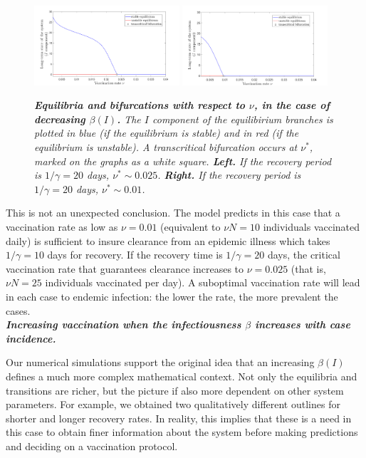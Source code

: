 \documentclass[10pt]{article}
\begin{document}
\begin{figure}[h!]
\begin{center}
\includegraphics[width=0.48\textwidth]{figures/decreasing_beta_gamma_20.png}
\includegraphics[width=0.48\textwidth]{figures/decreasing_beta_gamma_10.png}
\caption{\emph{{\bf Equilibria and bifurcations with respect to $\nu$, in the case of decreasing $\beta(I)$.} The $I$ component of the equilibirium branches is plotted in blue (if the equilibrium is stable) and in red (if the equilibrium is unstable). A transcritical bifurcation occurs at $\nu^*$, marked on the graphs as a white square. {\bf Left.} If the recovery period is $1/\gamma = 20$ days, $\nu^* \sim 0.025$. {\bf Right.} If the recovery period is $1/\gamma = 20$ days, $\nu^* \sim 0.01$.}}
\label{decreasing_beta}
\end{center}
\end{figure}


This is not an unexpected conclusion. The model predicts in this case that a vaccination rate as low as $\nu=0.01$ (equivalent to $\nu N =10$ individuals vaccinated daily) is sufficient to insure clearance from an epidemic illness which takes $1/\gamma =10$ days for recovery. If the recovery time is $1/\gamma = 20$ days, the critical vaccination rate that guarantees clearance increases to $\nu = 0.025$ (that is, $\nu N = 25$ individuals vaccinated per day). A suboptimal vaccination rate will lead in each case to endemic infection: the lower the rate, the more prevalent the cases.\\

\noindent \textbf{\emph{ Increasing vaccination when the infectiousness $\beta$ increases with case incidence.}} 

\noindent Our numerical simulations support the original idea that an increasing $\beta(I)$ defines a much more complex mathematical context. Not only the equilibria and transitions are richer, but the picture if also more dependent on other system parameters. For example, we obtained two qualitatively different outlines for shorter and longer recovery rates. In reality, this implies that these is a need in this case to obtain finer information about the system before making predictions and deciding on a vaccination protocol.
\end{document}

